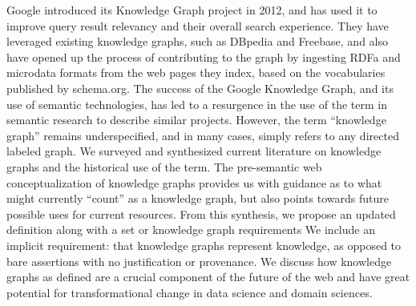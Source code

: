 Google introduced its Knowledge Graph project in 2012, and has used it to improve query result relevancy and their overall search experience.
They have leveraged existing knowledge graphs, such as DBpedia and Freebase, and also have opened up the process of contributing to the graph by ingesting RDFa and microdata formats from the web pages they index, based on the vocabularies published by schema.org.
The success of the Google Knowledge Graph, and its use of semantic technologies, has led to a resurgence in the use of the term in semantic research to describe similar projects.
However, the term ``knowledge graph'' remains underspecified, and in many cases, simply refers to any directed labeled graph.
We surveyed and synthesized current literature on knowledge graphs and the historical use of the term.  
The pre-semantic web conceptualization of knowledge graphs provides us with guidance as to what might currently ``count'' as a knowledge graph, but also points towards future possible uses for current resources.
From this synthesis, we propose an updated definition along with a set or knowledge graph requirements  We include an implicit requirement: that knowledge graphs represent knowledge, as opposed to bare assertions with no justification or provenance.
We discuss how knowledge graphs as defined are a crucial component of the future of the web and have great potential for transformational change in data science and domain sciences.
